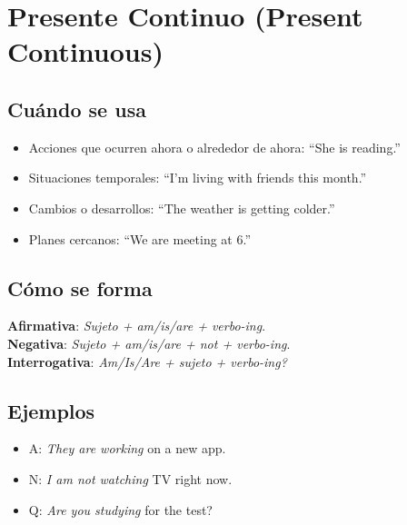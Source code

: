 \documentclass[11pt,a4paper]{article}
\begin{document}
\section{Presente Continuo (Present Continuous)}
\subsection*{Cuándo se usa}
\begin{itemize}
  \item Acciones que ocurren ahora o alrededor de ahora: ``She is reading.''
  \item Situaciones temporales: ``I’m living with friends this month.''
  \item Cambios o desarrollos: ``The weather is getting colder.''
  \item Planes cercanos: ``We are meeting at 6.''
\end{itemize}

\subsection*{Cómo se forma}
\textbf{Afirmativa}: \emph{Sujeto + am/is/are + verbo-ing}.\\
\textbf{Negativa}: \emph{Sujeto + am/is/are + not + verbo-ing}.\\
\textbf{Interrogativa}: \emph{Am/Is/Are + sujeto + verbo-ing?}

\subsection*{Ejemplos}
\begin{itemize}
  \item A: \emph{They are working} on a new app.
  \item N: \emph{I am not watching} TV right now.
  \item Q: \emph{Are you studying} for the test?
\end{itemize}
\end{document}
